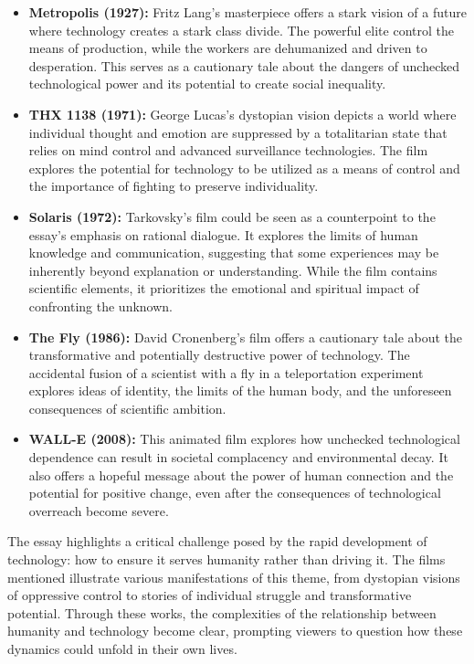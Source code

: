 \documentclass[11pt,fleqn]{book} %
\begin{document}
\begin{itemize}
\item \textbf{Metropolis (1927):}  Fritz Lang's masterpiece offers a stark vision of a future where technology creates a stark class divide.  The powerful elite control the means of production, while the workers are dehumanized and driven to desperation. This serves as a cautionary tale about the dangers of unchecked technological power and its potential to create social inequality.

\item \textbf{THX 1138 (1971):} George Lucas's dystopian vision depicts a world where individual thought and emotion are suppressed by a totalitarian state that relies on mind control and advanced surveillance technologies. The film explores the potential for technology to be utilized as a means of control and the importance of fighting to preserve individuality. 

\item \textbf{Solaris (1972):}  Tarkovsky's film could be seen as a counterpoint to the essay's emphasis on rational dialogue. It explores the limits of human knowledge and communication, suggesting that some experiences may be inherently beyond explanation or understanding. While the film contains scientific elements, it prioritizes the emotional and spiritual impact of confronting the unknown.

\item \textbf{The Fly (1986):}  David Cronenberg's film offers a cautionary tale about the transformative and potentially destructive power of technology.  The accidental fusion of a scientist with a fly in a teleportation experiment explores ideas of identity, the limits of the human body, and the unforeseen consequences of scientific ambition.

\item \textbf{WALL-E (2008):} This animated film explores how unchecked technological dependence can result in societal complacency and environmental decay. It also offers a hopeful message about the power of human connection and the potential for positive change, even after the consequences of technological overreach become severe. 
\end{itemize}

\vspace{5pt}

The essay highlights a critical challenge posed by the rapid development of technology: how to ensure it serves humanity rather than driving it. The films mentioned illustrate various manifestations of this theme,  from dystopian visions of oppressive control to stories of individual struggle and transformative potential. Through these works, the complexities of the relationship between humanity and technology become clear, prompting viewers to question how these dynamics could unfold in their own lives. 
\end{document}
